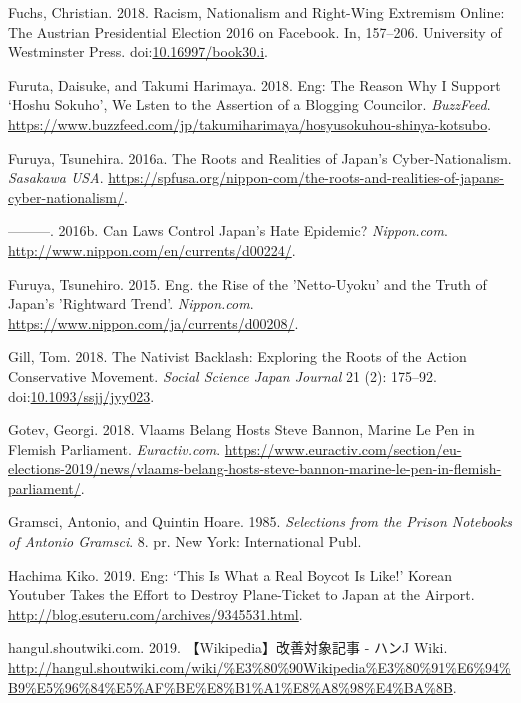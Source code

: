 \documentclass[10pt,british,A4paper,,openany]{memoir}
\begin{document}
\hypertarget{ref-fuchs_racism_2018}{}
Fuchs, Christian. 2018. Racism, Nationalism and Right-Wing Extremism
Online: The Austrian Presidential Election 2016 on Facebook. In,
157--206. University of Westminster Press.
doi:\href{https://doi.org/10.16997/book30.i}{10.16997/book30.i}.

\hypertarget{ref-furuta_eng:_2018}{}
Furuta, Daisuke, and Takumi Harimaya. 2018. Eng: The Reason Why I
Support `Hoshu Sokuho', We Lsten to the Assertion of a Blogging
Councilor. \emph{BuzzFeed}.
\url{https://www.buzzfeed.com/jp/takumiharimaya/hosyusokuhou-shinya-kotsubo}.

\hypertarget{ref-furuya_roots_2016}{}
Furuya, Tsunehira. 2016a. The Roots and Realities of Japan's
Cyber-Nationalism. \emph{Sasakawa USA}.
\url{https://spfusa.org/nippon-com/the-roots-and-realities-of-japans-cyber-nationalism/}.

\hypertarget{ref-furuya_can_2016}{}
---------. 2016b. Can Laws Control Japan's Hate Epidemic?
\emph{Nippon.com}. \url{http://www.nippon.com/en/currents/d00224/}.

\hypertarget{ref-furuya_eng._2015}{}
Furuya, Tsunehiro. 2015. Eng. the Rise of the 'Netto-Uyoku' and the
Truth of Japan's 'Rightward Trend'. \emph{Nippon.com}.
\url{https://www.nippon.com/ja/currents/d00208/}.

\hypertarget{ref-gill_nativist_2018}{}
Gill, Tom. 2018. The Nativist Backlash: Exploring the Roots of the
Action Conservative Movement. \emph{Social Science Japan Journal} 21
(2): 175--92.
doi:\href{https://doi.org/10.1093/ssjj/jyy023}{10.1093/ssjj/jyy023}.

\hypertarget{ref-gotev_vlaams_2018}{}
Gotev, Georgi. 2018. Vlaams Belang Hosts Steve Bannon, Marine Le Pen in
Flemish Parliament. \emph{Euractiv.com}.
\url{https://www.euractiv.com/section/eu-elections-2019/news/vlaams-belang-hosts-steve-bannon-marine-le-pen-in-flemish-parliament/}.

\hypertarget{ref-gramsci_selections_1985}{}
Gramsci, Antonio, and Quintin Hoare. 1985. \emph{Selections from the
Prison Notebooks of Antonio Gramsci}. 8. pr. New York: International
Publ.

\hypertarget{ref-hachima_kiko_eng:_2019}{}
Hachima Kiko. 2019. Eng: `This Is What a Real Boycot Is Like!' Korean
Youtuber Takes the Effort to Destroy Plane-Ticket to Japan at the
Airport. \url{http://blog.esuteru.com/archives/9345531.html}.

\hypertarget{ref-hangul.shoutwiki.com_wikipedia_2019}{}
hangul.shoutwiki.com. 2019. 【Wikipedia】改善対象記事 - ハンJ Wiki.
\url{http://hangul.shoutwiki.com/wiki/\%E3\%80\%90Wikipedia\%E3\%80\%91\%E6\%94\%B9\%E5\%96\%84\%E5\%AF\%BE\%E8\%B1\%A1\%E8\%A8\%98\%E4\%BA\%8B}.
\end{document}
